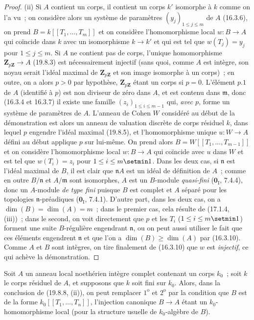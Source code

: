\begin{proof}
\medskip
\noindent(ii)\enspace
Si $A$ contient un corps, il contient un corps $k'$ isomorphe à $k$ comme on
l'a vu~; on considère alors un système de paramètres
$(y_j)_{1\leq j\leq m}$ de $A$ (16.3.6), on prend
$B=k[[T_1,\ldots,T_m]]$ et on considère l'homomorphisme local $w:B\to A$ qui
coïncide dans $k$ avec un isomorphisme $k\to k'$ et qui est tel que
$w(T_j)=y_j$ pour $1\leq j\leq m$. Si $A$ ne contient pas de corps, l'unique
homomorphisme $\mathbf Z_{p\mathbf Z}\to A$ (19.8.3) est nécessairement
injectif (sans quoi, comme $A$ est intègre, son noyau serait l'idéal maximal de
$\mathbf Z_{p\mathbf Z}$ et son image isomorphe à un corps)~; en outre, on a
alors $p>0$ par hypothèse, $\mathbf Z_{p\mathbf Z}$ étant un corps si $p=0$.
L'élément $p.1$ de $A$ (identifié à $p$) est non diviseur de zéro dans $A$,
et est contenu dans $\mathfrak m$, donc (16.3.4 et 16.3.7) il existe une famille
$(z_i)_{1\leq i\leq m-1}$ qui, \emph{avec $p$}, forme un système de paramètres de $A$.
L'anneau de Cohen $W$ considéré au début de la démonstration est alors un
anneau de valuation discrète de corps résiduel $k$, dans lequel $p$ engendre
l'idéal maximal (19.8.5), et l'homomorphisme unique $u:W\to A$ défini au début
applique $p$ sur lui-même. On prend alors $B=W[[T_1,\ldots,T_{m-1}]]$ et on
considère l'homomorphisme local $w:B\to A$ qui coïncide avec $u$ dans $W$ et
est tel que $w(T_i)=z_i$ pour $1\leq i\leq m\setmin 1$. Dans les deux cas, si
$\mathfrak n$ est l'idéal maximal de $B$, il est clair que $\mathfrak nA$ est
un idéal de définition de $A$~; comme en outre $B/\mathfrak n$ et
$A/\mathfrak m$ sont isomorphes, $A$ est un $B$-module \emph{quasi-fini}
($\mathbf 0_{\mathrm I}$, 7.4.4), donc un $A$-module \emph{de type fini} puisque $B$
est complet et $A$ séparé pour les topologies $\mathfrak n$-préadiques
($\mathbf 0_{\mathrm I}$, 7.4.1). D'autre part,
dans les deux cas, on a $\dim(B)=\dim(A)=m$~; dans le premier cas, cela résulte
de (17.1.4, (iii))~; dans le second, on voit directement que $p$ et les $T_i$
($1\leq i\leq m\setmin 1$) forment une suite $B$-régulière engendrant $\mathfrak n$,
ou on peut aussi utiliser le fait que ces éléments engendrent $\mathfrak n$ et
que l'on a $\dim(B)\geq\dim(A)$ par (16.3.10). Comme $A$ et $B$ sont intègres,
on tire finalement de (16.3.10) que $w$ est \emph{injectif}, ce qui achève la
démonstration.
\end{proof}

\begin{corollary}[19.8.9]
\label{0.19.8.9-fr}
Soit $A$ un anneau local noethérien intègre complet contenant un corps $k_0$~;
soit $k$ le corps résiduel de $A$, et supposons que $k$ soit fini sur $k_0$.
Alors, dans la conclusion de \textup{(19.8.8, (ii))}, on peut remplacer $1^{\mathrm o}$
et $2^{\mathrm o}$ par la condition que $B$ est de la forme
$k_0[[T_1,\ldots,T_n]]$, l'injection canonique $B\to A$ étant un
$k_0$-homomorphisme local (pour la structure usuelle de $k_0$-algèbre de $B$).
\end{corollary}

